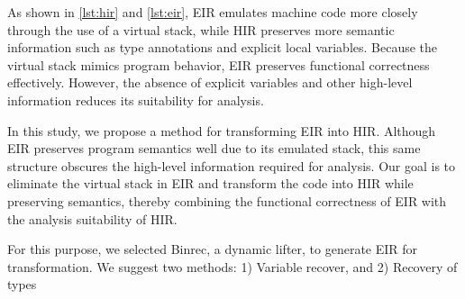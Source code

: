 As shown in \autoref{lst:hir} and \autoref{lst:eir}, EIR emulates machine code
more closely through the use of a virtual stack, while HIR preserves more
semantic information such as type annotations and explicit local variables.
Because the virtual stack mimics program behavior, EIR preserves functional
correctness effectively. However, the absence of explicit variables and other
high-level information reduces its suitability for analysis\cite{compiler-level-ir}\cite{pldi-scalable}.

In this study, we propose a method for transforming EIR into HIR. Although EIR
preserves program semantics well due to its emulated stack, this same structure
obscures the high-level information required for analysis. Our goal is to
eliminate the virtual stack in EIR and transform the code into HIR while
preserving semantics, thereby combining the functional correctness of EIR with
the analysis suitability of HIR.

For this purpose, we selected Binrec, a dynamic lifter\cite{euro-binrec}, to
generate EIR for transformation. We suggest two methods: 1) Variable recover,
and 2) Recovery of types

